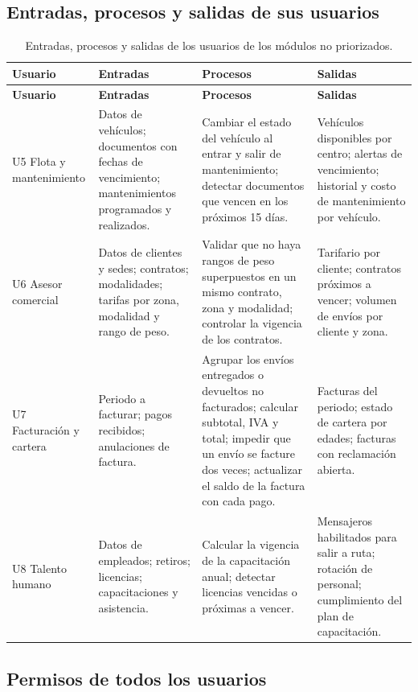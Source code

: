 \subsection{Entradas, procesos y salidas de sus usuarios}

{\singlespacing\small
\begin{longtable}{L{1.9cm} L{3.9cm} L{4.6cm} L{3.9cm}}
\caption{Entradas, procesos y salidas de los usuarios de los módulos no priorizados.}
\label{tab:epsotros}\\
\toprule
\textbf{Usuario} & \textbf{Entradas} & \textbf{Procesos} & \textbf{Salidas} \\
\midrule
\endfirsthead
\toprule
\textbf{Usuario} & \textbf{Entradas} & \textbf{Procesos} & \textbf{Salidas} \\
\midrule
\endhead
\bottomrule
\endfoot
U5 Flota y mantenimiento &
Datos de vehículos; documentos con fechas de vencimiento; mantenimientos
programados y realizados. &
Cambiar el estado del vehículo al entrar y salir de mantenimiento;
detectar documentos que vencen en los próximos 15 días. &
Vehículos disponibles por centro; alertas de vencimiento; historial y
costo de mantenimiento por vehículo. \\
\midrule
U6 Asesor comercial &
Datos de clientes y sedes; contratos; modalidades; tarifas por zona,
modalidad y rango de peso. &
Validar que no haya rangos de peso superpuestos en un mismo contrato,
zona y modalidad; controlar la vigencia de los contratos. &
Tarifario por cliente; contratos próximos a vencer; volumen de envíos
por cliente y zona. \\
\midrule
U7 Facturación y cartera &
Periodo a facturar; pagos recibidos; anulaciones de factura. &
Agrupar los envíos entregados o devueltos no facturados; calcular
subtotal, IVA y total; impedir que un envío se facture dos veces;
actualizar el saldo de la factura con cada pago. &
Facturas del periodo; estado de cartera por edades; facturas con
reclamación abierta. \\
\midrule
U8 Talento humano &
Datos de empleados; retiros; licencias; capacitaciones y asistencia. &
Calcular la vigencia de la capacitación anual; detectar licencias
vencidas o próximas a vencer. &
Mensajeros habilitados para salir a ruta; rotación de personal;
cumplimiento del plan de capacitación. \\
\end{longtable}
\par}

\subsection{Permisos de todos los usuarios}

